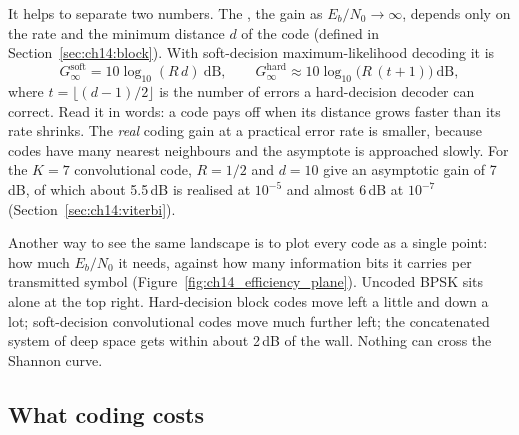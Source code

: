 It helps to separate two numbers. The , the gain as
$E_b/N_0\to\infty$, depends only on the rate and the minimum distance $d$ of the code (defined in
Section~\ref{sec:ch14:block}). With soft-decision maximum-likelihood decoding it is
\begin{equation}
G_{\infty}^{\text{soft}}=10\log_{10}(R\,d)\ \text{dB},\qquad
G_{\infty}^{\text{hard}}\approx10\log_{10}\!\big(R\,(t+1)\big)\ \text{dB},
\label{eq:ch14:acg}
\end{equation}
where $t=\lfloor(d-1)/2\rfloor$ is the number of errors a hard-decision decoder can correct. Read it
in words: a code pays off when its distance grows faster than its rate shrinks. The \emph{real}
coding gain at a practical error rate is smaller, because codes have many nearest neighbours and the
asymptote is approached slowly. For the $K=7$ convolutional code, $R=1/2$ and $d=10$ give an
asymptotic gain of 7\,dB, of which about 5.5\,dB is realised at $10^{-5}$ and almost 6\,dB at
$10^{-7}$ (Section~\ref{sec:ch14:viterbi}).

Another way to see the same landscape is to plot every code as a single point: how much
$E_b/N_0$ it needs, against how many information bits it carries per transmitted symbol
(Figure~\ref{fig:ch14_efficiency_plane}). Uncoded BPSK sits alone at the top right. Hard-decision
block codes move left a little and down a lot; soft-decision convolutional codes move much further
left; the concatenated system of deep space gets within about 2\,dB of the wall. Nothing can cross
the Shannon curve.


\subsection{What coding costs}

